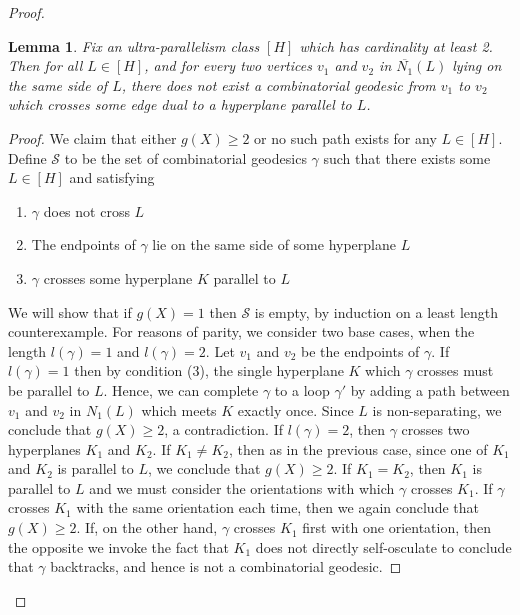 \documentclass[11pt]{amsart}
\numberwithin{thm}{section}
\newtheorem{lemma}[thm]{Lemma}
\theoremstyle{remark}
\theoremstyle{definition}
\newcommand{\overl}[1]{\overline{#1}}
\begin{document}
\begin{proof}
%
\begin{lemma}\label{otherSide}Fix an ultra-parallelism class $[H]$ which has cardinality at least 2.  Then for all $L\in [H]$, and for every two vertices $v_1$ and $v_2$ in $\overl{N_1}(L)$ lying on the same side of $L$, there does not exist a combinatorial geodesic from $v_1$ to $v_2$ which crosses some edge dual to a hyperplane parallel to $L$.
\end{lemma}
\begin{proof} We claim that either $g(X)\geq 2$ or no such path exists for any $L\in [H]$.  Define $\mathcal{S}$ to be the set of combinatorial geodesics $\gamma$ such that there exists some $L\in [H]$ and satisfying
\begin{enumerate}
\item $\gamma$ does not cross $L$
\item The endpoints of $\gamma$ lie on the same side of some hyperplane $L$
\item $\gamma$ crosses some hyperplane $K$ parallel to $L$ 
\end{enumerate}
We will show that if $g(X)=1$ then $\mathcal{S}$ is empty, by induction on a least length counterexample. For reasons of parity, we consider two base cases, when the length $l(\gamma)=1$ and $l(\gamma)=2$. Let $v_1$ and $v_2$ be the endpoints of $\gamma$.  If $l(\gamma)=1$ then by condition (3), the single hyperplane $K$ which $\gamma$ crosses must be parallel to $L$. Hence, we can complete $\gamma$ to a loop $\gamma'$ by adding a path between $v_1$ and $v_2$ in $N_1(L)$ which meets $K$ exactly once.  Since $L$ is non-separating, we conclude that $g(X)\geq 2$, a contradiction.  If $l(\gamma)=2$, then $\gamma$ crosses two hyperplanes $K_1$ and $K_2$.  If $K_1\neq K_2$, then as in the previous case, since one of $K_1$ and $K_2$ is parallel to $L$, we conclude that $g(X)\geq 2$. If $K_1=K_2$, then $K_1$ is parallel to $L$ and we must consider the orientations with which $\gamma$ crosses $K_1$. If $\gamma$ crosses $K_1$ with the same orientation each time, then we again conclude that $g(X)\geq 2$.  If, on the other hand, $\gamma$ crosses $K_1$ first with one orientation, then the opposite we invoke the fact that $K_1$ does not directly self-osculate to conclude that $\gamma$ backtracks, and hence is not a combinatorial geodesic. 


\end{proof}
\end{proof}
\end{document}
